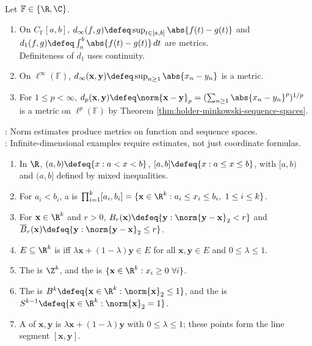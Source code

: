 \begin{example} \label{ex:function-and-sequence-metric-spaces} \\
Let $\mathbb{F}\in\{\R,\C\}$.
\begin{enumerate}[label=(\roman*)]
\setlength{\itemsep}{0pt}
\item On $C_{\mathbb{F}}[a,b]$, $d_\infty(f,g)\defeq\sup_{t\in[a,b]}\abs{f(t)-g(t)}$ and $d_1(f,g)\defeq\int_a^b\abs{f(t)-g(t)}\,dt$ are metrics.\\
Definiteness of $d_1$ uses continuity.
\item On $\ell^\infty(\mathbb{F})$, $d_\infty(\mathbf{x},\mathbf{y})\defeq\sup_{n\geq1}\abs{x_n-y_n}$ is a metric.
\item For $1\leq p<\infty$, $d_p(\mathbf{x},\mathbf{y})\defeq\norm{\mathbf{x}-\mathbf{y}}_p=(\sum_{n\geq1}\abs{x_n-y_n}^p)^{1/p}$ is a metric on $\ell^p(\mathbb{F})$ by Theorem \ref{thm:holder-minkowski-sequence-spaces}.
\end{enumerate}
: Norm estimates produce metrics on function and sequence spaces.\\
: Infinite-dimensional examples require estimates, not just coordinate formulas.
\end{example}

\begin{definition} \label{def:euclidean-intervals-cells-balls-convex} 
\begin{enumerate}[label=(\roman*)]
\setlength{\itemsep}{0pt}
\item In $\R$, $(a,b)\defeq\{x:a<x<b\}$, $[a,b]\defeq\{x:a\leq x\leq b\}$, with $[a,b)$ and $(a,b]$ defined by mixed inequalities.
\item For $a_i<b_i$, a  is $\prod_{i=1}^{k}[a_i,b_i]=\{\mathbf{x}\in\R^k:a_i\leq x_i\leq b_i,\ 1\leq i\leq k\}$.
\item For $\mathbf{x}\in\R^k$ and $r>0$, $B_r(\mathbf{x})\defeq\{\mathbf{y}:\norm{\mathbf{y}-\mathbf{x}}_2<r\}$ and $\overline{B}_r(\mathbf{x})\defeq\{\mathbf{y}:\norm{\mathbf{y}-\mathbf{x}}_2\leq r\}$.
\item $E\subseteq\R^k$ is  iff $\lambda\mathbf{x}+(1-\lambda)\mathbf{y}\in E$ for all $\mathbf{x},\mathbf{y}\in E$ and $0\leq\lambda\leq1$.
\item The  is $\Z^k$, and the  is $\{\mathbf{x}\in\R^k:x_i\geq0\ \forall i\}$.
\item The  is $B^k\defeq\{\mathbf{x}\in\R^k:\norm{\mathbf{x}}_2\leq1\}$, and the  is $S^{k-1}\defeq\{\mathbf{x}\in\R^k:\norm{\mathbf{x}}_2=1\}$.
\item A  of $\mathbf{x},\mathbf{y}$ is $\lambda\mathbf{x}+(1-\lambda)\mathbf{y}$ with $0\leq\lambda\leq1$; these points form the line segment $[\mathbf{x},\mathbf{y}]$.
\end{enumerate}
\end{definition}

